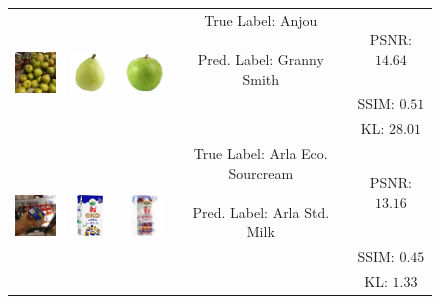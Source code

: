 \begin{figure}[t]
\begin{tabular}{c c c c c}
         \multirow{3}{*}{\includegraphics[width=15mm, height=15mm]{figures_and_tables/decoded_iconic_images/Anjou_015.jpg}} & \multirow{3}{*}{\includegraphics[width=15mm, height=15mm]{figures_and_tables/iconic_image_figures/Anjou-Pear_Clean.jpg}} & \multirow{3}{*}{\includegraphics[width=15mm, height=15mm]{figures_and_tables/decoded_iconic_images/vcca_xiwy/anjou_pear_image849.png}} & \multirowcell{3}{True Label: Anjou\\ \\ Pred. Label: Granny Smith} & PSNR: $14.64$ \\
         & & & & SSIM: $0.51$ \\
         & & & & KL: $28.01$ \\

         \multirow{3}{*}{\includegraphics[width=15mm, height=15mm]{figures_and_tables/decoded_iconic_images/Arla-Ecological-Sour-Cream_005.jpg}} & \multirow{3}{*}{\includegraphics[width=15mm, height=15mm]{figures_and_tables/iconic_image_figures/Arla-Ecological-Sour-Cream_Iconic.jpg}} & \multirow{3}{*}{\includegraphics[width=15mm, height=15mm]{figures_and_tables/decoded_iconic_images/vcca_xiwy/arla_eco_sourcream_image1565.png}} & \multirowcell{3}{True Label: Arla Eco. Sourcream\\ \\ Pred. Label: Arla Std. Milk} & PSNR: $13.16$ \\
         & & & & SSIM: $0.45$ \\
         & & & & KL: $1.33$ \\
        \hline
    \end{tabular}
    \label{fig:decoded_iconic_images_with_metrics}
\end{figure}